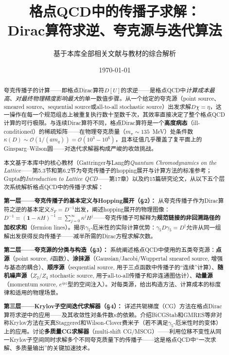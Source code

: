 \documentclass[12pt,a4paper]{ctexart}
\title{\heiti 格点QCD中的传播子求解：\\
Dirac算符求逆、夸克源与迭代算法}
\author{基于本库全部相关文献与教材的综合解析}
\date{\today}
\theoremstyle{definition}
\begin{document}
\maketitle

\begin{abstract}
\noindent
夸克传播子的计算——即格点Dirac算符$D[U]$的求逆——是格点QCD中\emph{计算成本最高、对最终物理精度影响最大}的单一数值步骤。从一个给定的夸克源（point source、smeared source、sequential source或all-to-all stochastic source）出发求解$D \chi = \eta$，这一操作在每一个规范组态上被重复执行数十至数千次，其效率直接决定了整个格点QCD计算的可行极限。与连续Dirac算符不同，格点Dirac算符是一个\textbf{高度病态}（ill-conditioned）的稀疏矩阵——在物理夸克质量（$m_\pi \sim 135$~MeV）处条件数$\kappa(D) \sim \mathcal{O}(1/(a m_q)) = \mathcal{O}(10^3-10^6)$，且本征值几乎覆盖了复平面上的Ginsparg--Wilson圆——对迭代求解器构成严峻的收敛挑战。

本文基于本库中的核心教材（Gattringer与Lang的\textit{Quantum Chromodynamics on the Lattice}——第5.3节和第6.2节为夸克传播子的hopping展开与计算方法的标准参考；Gupta的\textit{Introduction to Lattice QCD}——第17章）以及约15篇研究论文，从以下五个层次系统解析格点QCD中的传播子求解：

\textbf{第一层——夸克传播子的基本定义与Hopping展开（§2）：}
从夸克传播子作为Dirac算符之逆的基本定义$S_F = D^{-1}$出发，阐述hopping展开的物理图像：$D^{-1} = (\mathbf{1} - \kappa H)^{-1} = \sum_{j=0}^\infty \kappa^j H^j$——夸克传播子可解释为\textbf{规范链接的非回溯路径的加权求和}（fermion lines）。揭示$\gamma_5$-厄米性的实际计算优势：$\gamma_5 D \gamma_5 = D^\dagger$允许从同一组解出发获得反向传播子——减半所需的Dirac方程求解次数。

\textbf{第二层——夸克源的分类与构造（§3）：}
系统阐述格点QCD中使用的五类夸克源：\textbf{点源}（point source, $\delta$函数）、\textbf{涂抹源}（Gaussian/Jacobi/Wuppertal smeared source, 增强与基态的耦合）、\textbf{顺序源}（sequential source, 用于三点函数中传播子的``连续''计算）、\textbf{随机噪声源}（$Z_2/Z_4$ stochastic source, 用于all-to-all传播子和非连通图估计）、\textbf{动量源}（momentum source, $e^{i p z}$型的空间注入）。对每类源，给出构造方法、计算成本的标度律和适用的物理场景。

\textbf{第三层——Krylov子空间迭代求解器（§4）：}
详述共轭梯度（CG）方法在格点Dirac算符求逆中的应用——及其收敛性对条件数$\kappa$的依赖。介绍BiCGStab和GMRES等非对称Krylov方法在天真Staggered和Wilson-Clover费米子（若不满足$\gamma_5$-厄米性时的变体）上的应用。讨论\textbf{多质量CG求解器}（multi-shift CG/MSCG）——利用位移不变性从同一Krylov子空间同时求解多个不同夸克质量下的传播子——这是格点QCD中``一次求解、多质量输出''的关键加速技术。


\end{abstract}
\end{document}

